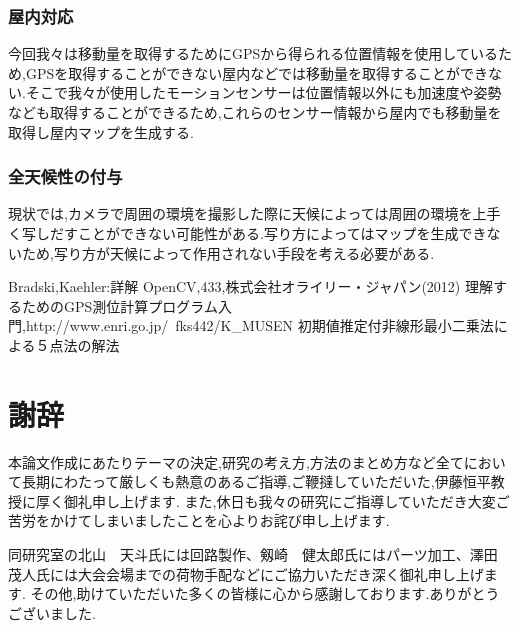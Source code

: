 \documentclass[12pt,oneside]{sotsuken_paper}
\begin{document}
\subsection{屋内対応}
今回我々は移動量を取得するためにGPSから得られる位置情報を使用しているため,GPSを取得することができない屋内などでは移動量を取得することができない.そこで我々が使用したモーションセンサーは位置情報以外にも加速度や姿勢なども取得することができるため,これらのセンサー情報から屋内でも移動量を取得し屋内マップを生成する.

\subsection{全天候性の付与}
現状では,カメラで周囲の環境を撮影した際に天候によっては周囲の環境を上手く写しだすことができない可能性がある.写り方によってはマップを生成できないため,写り方が天候によって作用されない手段を考える必要がある.

\begin{thebibliography}{8}
 Bradski,Kaehler:詳解 OpenCV,433,株式会社オライリー・ジャパン(2012)
 理解するためのGPS測位計算プログラム入門,http://www.enri.go.jp/~fks442/K\_MUSEN
 初期値推定付非線形最小二乗法による５点法の解法
\end{thebibliography}



\chapter*{謝辞}
本論文作成にあたりテーマの決定,研究の考え方,方法のまとめ方など全てにおいて長期にわたって厳しくも熱意のあるご指導,ご鞭撻していただいた,伊藤恒平教授に厚く御礼申し上げます.
また,休日も我々の研究にご指導していただき大変ご苦労をかけてしまいましたことを心よりお詫び申し上げます.

同研究室の北山　天斗氏には回路製作、剱崎　健太郎氏にはパーツ加工、澤田　茂人氏には大会会場までの荷物手配などにご協力いただき深く御礼申し上げます.
その他,助けていただいた多くの皆様に心から感謝しております.ありがとうございました.
%
\end{document}
